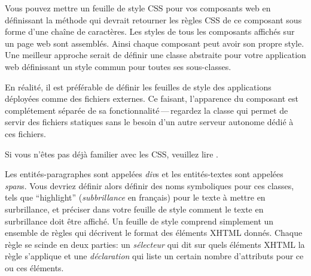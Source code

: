 \documentclass[a4paper,10pt,twoside]{book}
\begin{document}
Vous pouvez mettre un feuille de style CSS pour vos composants web en
définissant la méthode  qui devrait retourner les règles CSS
de ce composant sous forme d'une chaîne de caractères.
Les styles de tous les composants affichés sur un page web sont
assemblés. Ainsi chaque composant peut avoir son propre style.
Une meilleur approche serait de définir une classe abstraite pour
votre application web définissant un style commun pour toutes ses
sous-classes. %

En réalité, il est préférable de définir les feuilles de style des
applications déployées comme des fichiers externes.
Ce faisant, l'apparence du composant est complétement séparée de sa
fonctionnalité\,---\,regardez la classe  qui
permet de servir des fichiers statiques sans le besoin d'un autre
serveur autonome
dédié à ces fichiers.

Si vous n'êtes pas déjà familier avec les CSS, veuillez lire
.

Les entités-paragraphes sont appelées \emph{div}s et les
entités-textes sont appelées \emph{span}s.
Vous devriez définir alors définir des noms symboliques pour ces
classes, tels que ``highlight'' (\emph{subbrillance} en français) pour
le texte à mettre en surbrillance, et préciser dans votre feuille de
style comment le texte en surbrillance doit être affiché.
Un feuille de style comprend simplement un ensemble de règles qui
décrivent le format des éléments XHTML donnés. 
Chaque règle se scinde en deux parties: un \emph{sélecteur} qui
dit sur quels éléments XHTML la règle s'applique et une
\emph{déclaration} qui liste un certain nombre d'attributs pour ce ou
ces éléments.
\end{document}
